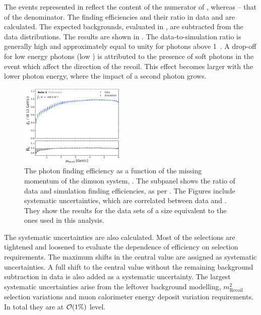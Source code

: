 The events represented in  reflect the content of the numerator of , whereas  -- that of the denominator.
The finding efficiencies and their ratio in data and \MC are calculated.
The expected backgrounds, evaluated in \MC, are subtracted from the data distributions.
The results are shown in .
The data-to-simulation ratio is generally high and approximately equal to unity for photons above 1~\gev.
A drop-off for low energy photons (low \pRecoil) is attributed to the presence of soft \ISR photons in the event which affect the direction of the recoil.
This effect becomes larger with the lower photon energy, where the impact of a second \ISR photon grows.
\begin{figure}[hbtp!]
    \centering
    \includegraphics[width=0.45\textwidth]{figures/data_sim_corrections/pyth_data_mc_agreement_pRecoil.pdf}
    \caption{\label{fig:data_mc_photon_eff} The photon finding efficiency as a function of the missing momentum of the dimuon system, \pRecoil.
    The subpanel shows the ratio of data and simulation finding efficiencies, as per .
    The Figures include systematic uncertainties, which are correlated between data and \MC.
    They show the results for the data sets of a size equivalent to the ones used in this analysis.
    }
\end{figure}

The systematic uncertainties are also calculated.
Most of the selections are tightened and loosened to evaluate the dependence of efficiency on selection requirements.
The maximum shifts in the central value are assigned as systematic uncertainties.
A full shift to the central value without the remaining background subtraction in data is also added as a systematic uncertainty.
The largest systematic uncertainties arise from the leftover background modelling, $m^2_{\mathrm{Recoil}}$ selection variations and muon calorimeter energy deposit variation requirements.
In total they are at ${\cal O}(1\%)$ level.

